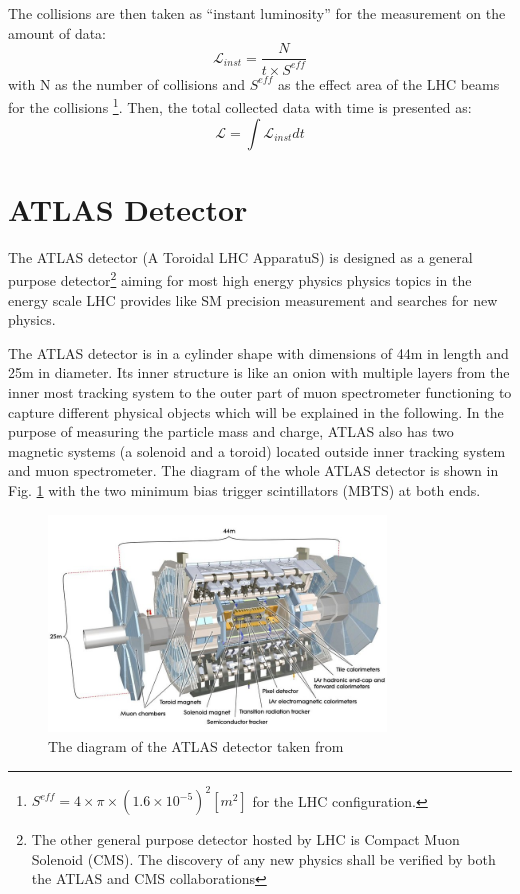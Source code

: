 \\
\\The collisions are then taken as ``instant luminosity'' for the measurement on the amount of data:
\begin{equation}
\mathcal{L}_{inst} = \frac{N}{t\times S^{eff}}
\end{equation}
with N as the number of collisions and $S^{eff}$ as the effect area of the LHC beams for the collisions \footnote{$S^{eff}=4\times\pi\times(1.6\times 10^{-5})^2[m^2]$ for the LHC configuration.}. Then, the total collected data with time is presented as:
\begin{equation}
\mathcal{L} = \int \mathcal{L}_{inst}dt
\end{equation} 
\section{ATLAS Detector}
The ATLAS detector (A Toroidal LHC ApparatuS) \cite{Airapetian:391176} is designed as a general purpose detector\footnote{The other general purpose detector hosted by LHC is Compact Muon Solenoid (CMS). The discovery of any new physics shall be verified by both the ATLAS and CMS collaborations} aiming for most high energy physics physics topics in the energy scale LHC provides like SM precision measurement and searches for new physics.

The ATLAS detector is in a cylinder shape with dimensions of 44m in length and 25m in diameter. Its inner structure is like an onion with multiple layers from the inner most tracking system to the outer part of muon spectrometer functioning to capture different physical objects which will be explained in the following. In the purpose of measuring the particle mass and charge, ATLAS also has two magnetic systems (a solenoid and a toroid) located outside inner tracking system and muon spectrometer. The diagram of the whole ATLAS detector is shown in Fig. \ref{Fig:ATLAS} with the two minimum bias trigger scintillators (MBTS) at both ends.

\begin{figure}[!h]                
	\includegraphics[width=0.8\textwidth]{Chapter2/ATLAS.jpg}
	\centering
	\begin{center}
		\caption{The diagram of the ATLAS detector taken from \cite{Collaboration_2008}}
		\label{Fig:ATLAS}            
	\end{center}
\end{figure}

